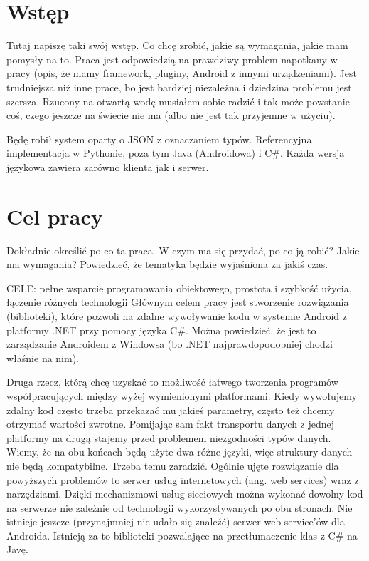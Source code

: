 \documentclass[twoside,a4paper]{book}
\begin{document}
\section{Wstęp}
Tutaj napiszę taki swój wstęp. Co chcę zrobić, jakie są wymagania, jakie mam pomysły na to.
Praca jest odpowiedzią na prawdziwy problem napotkany w pracy (opis, że mamy framework, pluginy, Android z innymi urządzeniami).
Jest trudniejsza niż inne prace, bo jest bardziej niezależna i dziedzina problemu jest szersza. Rzucony na otwartą wodę musiałem sobie radzić i tak może powstanie coś, czego jeszcze na świecie nie ma (albo nie jest tak przyjemne w użyciu).

Będę robił system oparty o JSON z oznaczaniem typów. Referencyjna implementacja w Pythonie, poza tym Java (Androidowa) i C\#. Każda wersja językowa zawiera zarówno klienta jak i serwer.

\section{Cel pracy}
Dokładnie określić po co ta praca. W czym ma się przydać, po co ją robić? Jakie ma wymagania?
Powiedzieć, że tematyka będzie wyjaśniona za jakiś czas.

CELE: pełne wsparcie programowania obiektowego, prostota i szybkość użycia, łączenie różnych technologii
Głównym celem pracy jest stworzenie rozwiązania (biblioteki), które pozwoli na zdalne wywoływanie kodu w systemie Android z platformy .NET przy pomocy języka C\#. Można powiedzieć, że jest to zarządzanie Androidem z Windowsa (bo .NET najprawdopodobniej chodzi właśnie na nim).

Druga rzecz, którą chcę uzyskać to możliwość łatwego tworzenia programów współpracujących między wyżej wymienionymi platformami. Kiedy wywołujemy zdalny kod często trzeba przekazać mu jakieś parametry, często też chcemy otrzymać wartości zwrotne. Pomijając sam fakt transportu danych z jednej platformy na drugą stajemy przed problemem niezgodności typów danych. Wiemy, że na obu końcach będą użyte dwa różne języki, więc struktury danych nie będą kompatybilne. Trzeba temu zaradzić.
Ogólnie ujęte rozwiązanie dla powyższych problemów to serwer usług internetowych (ang. web services) wraz z narzędziami. Dzięki mechanizmowi usług sieciowych można wykonać dowolny kod na serwerze nie zależnie od technologii wykorzystywanych po obu stronach. Nie istnieje jeszcze (przynajmniej nie udało się znaleźć) serwer web service’ów dla Androida. Istnieją za to biblioteki pozwalające na przetłumaczenie klas z C\# na Javę.
\end{document}
